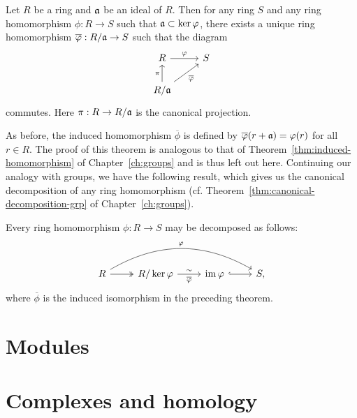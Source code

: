 \begin{theorem}
    \label{thm:ideal-universal-property}
    Let \(R\) be a ring and \(\mathfrak{a}\) be an ideal of \(R\). Then for any ring
    \(S\) and any ring homomorphism \(\phi: R \to S\) such that \(\mathfrak{a}
    \subset \ker \varphi\), there exists a unique ring homomorphism
    \(\overline{\varphi}: R/\mathfrak{a} \to S\) such that the diagram
    \[
        \begin{tikzcd}
            R \ar[r, "\phi"] & S\\
            R/\idl{a} \ar[u, "\pi"] \ar[ur, "\overline{\phi}"']
        \end{tikzcd}
    \]
    commutes. Here \(\pi: R \to R/\mathfrak{a}\) is the canonical projection.
\end{theorem}

As before, the induced homomorphism \(\overline{\phi}\) is defined by
\(\overline{\varphi}(r + \mathfrak{a}) = \varphi(r)\) for all \(r \in R\). The proof of
this theorem is analogous to that of Theorem~\ref{thm:induced-homomorphism} of
Chapter~\ref{ch:groups} and is thus left out here. Continuing our analogy with
groups, we have the following result, which gives us the canonical decomposition
of any ring homomorphism (cf. Theorem~\ref{thm:canonical-decomposition-grp} of
Chapter~\ref{ch:groups}).

\begin{theorem}
    \label{thm:canonical-decomposition-ring}
    Every ring homomorphism \(\phi: R \to S\) may be decomposed as follows:
    \[
        \begin{tikzcd}
            R \arrow[r, two heads] \arrow[rrr, bend left, "\phi"]   & R/\ker\phi \arrow[r,"\sim" above, "\overline{\phi}" below]   & \img\phi \arrow[r, hook]  & S,
        \end{tikzcd}
    \]
    where \(\overline{\phi}\) is the induced isomorphism in the preceding
    theorem.
\end{theorem}

\section{Modules}

\section{Complexes and homology}